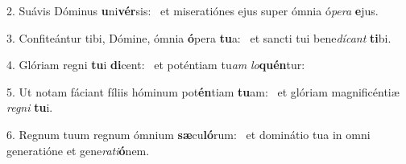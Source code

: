 2. Suávis Dóminus \textbf{u}ni\textbf{vér}sis: \ast\  et miseratiónes ejus super ómnia ó\textit{pe}\textit{ra} \textbf{e}jus.\

3. Confiteántur tibi, Dómine, ómnia \textbf{ó}pera \textbf{tu}a: \ast\  et sancti tui bene\textit{dí}\textit{cant} \textbf{ti}bi.\

4. Glóriam regni \textbf{tu}i \textbf{di}cent: \ast\  et poténtiam tu\textit{am} \textit{lo}\textbf{quén}tur:\

5. Ut notam fáciant fíliis hóminum pot\textbf{én}tiam \textbf{tu}am: \ast\  et glóriam magnificéntiæ \textit{re}\textit{gni} \textbf{tu}i.\

6. Regnum tuum regnum ómnium \textbf{sæ}cu\textbf{ló}rum: \ast\  et dominátio tua in omni generatióne et gene\textit{ra}\textit{ti}\textbf{ó}nem.\

